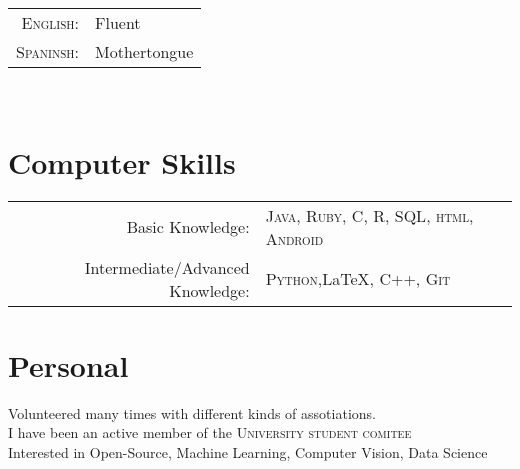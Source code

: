 \documentclass[a4paper,11pt]{article} %
\begin{document}
\begin{tabular}{rl}
\textsc{English:} & Fluent\\

\textsc{Spaninsh:} & Mothertongue\\
\end{tabular}\\


\section{Computer Skills}

\begin{tabular}{rl}
Basic Knowledge: & \textsc{Java}, \textsc{Ruby}, \textsc{C}, \textsc{R}, \textsc{SQL}, \textsc{html}, \textsc{Android}\\

Intermediate/Advanced Knowledge: & \textsc{Python},\LaTeX, \textsc{C++}, \textsc{Git}\\


\end{tabular}


\section{Personal}

Volunteered many times with different kinds of assotiations.\\
I have been an active member of the \textsc{University student comitee}\\
Interested in Open-Source, Machine Learning, Computer Vision, Data Science
\end{document}
